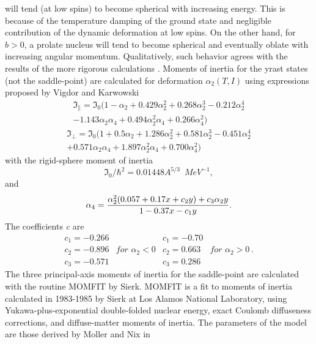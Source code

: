 will tend (at low spins) to become spherical with increasing energy. This is
because of the temperature damping of the ground state and negligible
contribution of the dynamic deformation at low spins. On the other hand, for
$b>0$, a prolate nucleus will tend to become spherical and eventually oblate
with increasing angular momentum. Qualitatively, such behavior agrees with
the results of the more rigorous calculations \cite{and76}. Moments of
inertia for the yrast states (not the saddle-point) are calculated for
deformation $\alpha_{2}(T,I)$ using expressions proposed by Vigdor and
Karwowski \cite{VK}
\begin{eqnarray}
\Im_{\parallel}=\Im_{0}(1-\alpha_{2}+0.429\alpha_{2}^{2}+0.268%
\alpha_{2}^{3}-0.212\alpha_{2}^{4}  \nonumber \\
-1.143\alpha_{2}\alpha_{4}+0.494\alpha_{2}^{2}\alpha_{4}+0.266\alpha_{4}^{2})
\label{MOMpar}
\end{eqnarray}
\begin{eqnarray}
\Im_{\perp}=\Im_{0}(1+0.5\alpha_{2}+1.286\alpha_{2}^{2}+0.581%
\alpha_{2}^{3}-0.451\alpha_{2}^{4}  \nonumber \\
+0.571\alpha_{2}\alpha_{4}+1.897\alpha_{2}^{2}\alpha_{4}+0.700\alpha_{4}^{2})
\label{MOMort}
\end{eqnarray}
with the rigid-sphere moment of inertia
\begin{equation}
\Im_{0}/\hbar^{2}=0.01448A^{5/3}\,\,\, MeV^{-1},
\end{equation}
and
\begin{equation}
\alpha_{4}=\frac{\alpha_{2}^{2}(0.057+0.17x+c_{2}y)+c_{3}\alpha_{2}y}{%
1-0.37x-c_{1}y}.
\end{equation}
The coefficients \emph{c} are
\begin{equation}
\begin{array}{llll}
c_{1}=-0.266 &  & c_{1}=-0.70 &  \\
c_{2}=-0.896 & for\,\,\alpha_{2}<0 & c_{2}=0.663 & for\,\,\alpha_{2}>0\,. \\
c_{3}=-0.571 &  & c_{3}=0.286 &
\end{array}%
\end{equation}
The three principal-axis moments of inertia for the saddle-point are
calculated with the routine MOMFIT \cite{sierk} by Sierk. MOMFIT is a fit to
moments of inertia calculated in 1983-1985 by Sierk at Los Alamos National
Laboratory, using Yukawa-plus-exponential double-folded nuclear energy,
exact Coulomb diffuseness corrections, and diffuse-matter moments of
inertia. The parameters of the model are those derived by Moller and Nix in
